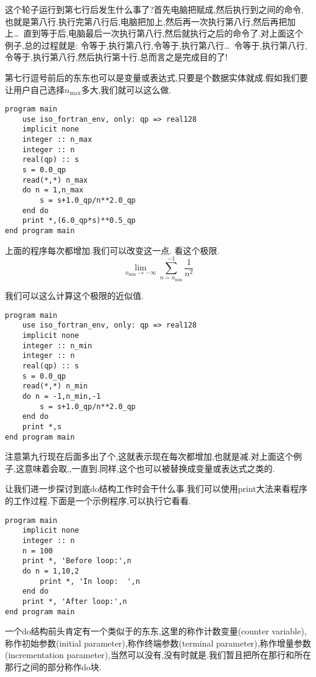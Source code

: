 这个轮子运行到第七行后发生什么事了?首先电脑把赋成,然后执行到之间的命令,也就是第八行.执行完第八行后,电脑把加上,然后再一次执行第八行,然后再把加上\dots~直到等于后,电脑最后一次执行第八行,然后就执行之后的命令了.对上面这个例子,总的过程就是: 令等于,执行第八行,令等于,执行第八行\dots~令等于,执行第八行,令等于,执行第八行,然后执行第十行.总而言之是完成目的了!

第七行逗号前后的东东也可以是变量或表达式,只要是个数据实体就成.假如我们要让用户自己选择$n_{\text{max}}$多大,我们就可以这么做.
\begin{lstlisting}
program main
    use iso_fortran_env, only: qp => real128
    implicit none
    integer :: n_max
    integer :: n
    real(qp) :: s
    s = 0.0_qp
    read(*,*) n_max
    do n = 1,n_max
        s = s+1.0_qp/n**2.0_qp
    end do
    print *,(6.0_qp*s)**0.5_qp
end program main
\end{lstlisting}

上面的程序每次都增加.我们可以改变这一点.
看这个极限.
\begin{equation*}
    \lim_{n_{\text{min}}\rightarrow-\infty}\sum_{n=n_{\text{min}}}^{-1} \frac{1}{n^2} 
\end{equation*}

我们可以这么计算这个极限的近似值.
\begin{lstlisting}
program main
    use iso_fortran_env, only: qp => real128
    implicit none
    integer :: n_min
    integer :: n
    real(qp) :: s
    s = 0.0_qp
    read(*,*) n_min
    do n = -1,n_min,-1
        s = s+1.0_qp/n**2.0_qp
    end do
    print *,s
end program main
\end{lstlisting}
注意第九行现在后面多出了个,这就表示现在每次都增加,也就是减.对上面这个例子,这意味着会取,,一直到.同样,这个也可以被替换成变量或表达式之类的.

让我们进一步探讨到底do结构工作时会干什么事.我们可以使用print大法来看程序的工作过程.下面是一个示例程序,可以执行它看看.
\begin{lstlisting}
program main
    implicit none
    integer :: n
    n = 100
    print *, 'Before loop:',n
    do n = 1,10,2
        print *, 'In loop:  ',n
    end do
    print *, 'After loop:',n
end program main
\end{lstlisting}

一个do结构前头肯定有一个类似于的东东,这里的称作计数变量(counter variable),称作初始参数(initial parameter),称作终端参数(terminal parameter),称作增量参数(incrementation parameter),当然可以没有,没有时就是.我们暂且把所在那行和所在那行之间的部分称作do块.

